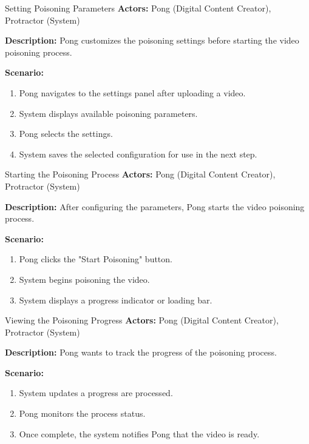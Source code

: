 \begin{usecase}{Setting Poisoning Parameters}
    \textbf{Actors:} Pong (Digital Content Creator), Protractor (System)

    \textbf{Description:} Pong customizes the poisoning settings before starting the video poisoning process.

    \textbf{Scenario:}
    \begin{enumerate}[leftmargin=80pt]
        \item Pong navigates to the settings panel after uploading a video.
        \item System displays available poisoning parameters.
        \item Pong selects the settings.
        \item System saves the selected configuration for use in the next step.
    \end{enumerate}
\end{usecase}

\begin{usecase}{Starting the Poisoning Process}
    \textbf{Actors:} Pong (Digital Content Creator), Protractor (System)

    \textbf{Description:} After configuring the parameters, Pong starts the video poisoning process.

    \textbf{Scenario:}
    \begin{enumerate}[leftmargin=80pt]
        \item Pong clicks the "Start Poisoning" button.
        \item System begins poisoning the video.
        \item System displays a progress indicator or loading bar.
    \end{enumerate}
\end{usecase}

\begin{usecase}{Viewing the Poisoning Progress}
    \textbf{Actors:} Pong (Digital Content Creator), Protractor (System)

    \textbf{Description:} Pong wants to track the progress of the poisoning process.

    \textbf{Scenario:}
    \begin{enumerate}[leftmargin=80pt]
        \item System updates a progress are processed.
        \item Pong monitors the process status.
        \item Once complete, the system notifies Pong that the video is ready.
    \end{enumerate}
\end{usecase}

